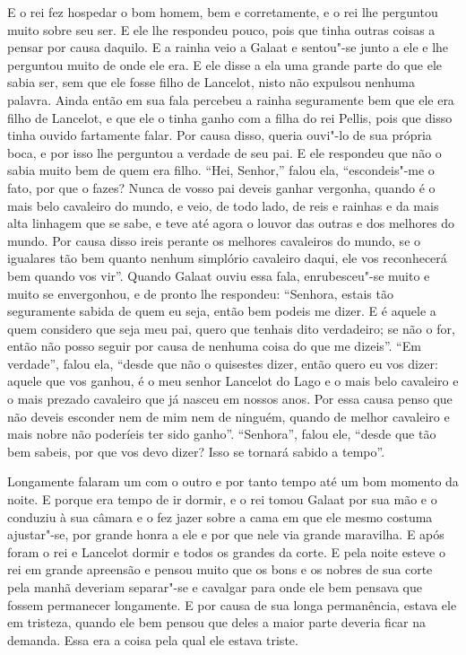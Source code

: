 E o rei fez hospedar o bom homem, bem e corretamente, e o rei lhe perguntou
muito sobre seu ser. E ele lhe respondeu pouco, pois que tinha outras coisas a
pensar por causa daquilo. E a rainha veio a Galaat e sentou"-se junto a ele e
lhe perguntou muito de onde ele era. E ele disse a ela uma grande parte do que
ele sabia ser, sem que ele fosse filho de Lancelot, nisto não expulsou nenhuma
palavra. Ainda então em sua fala percebeu a rainha seguramente bem que ele era
filho de Lancelot, e que ele o tinha ganho com a filha do rei Pellis,  pois
que disso tinha ouvido fartamente falar. Por causa disso, queria ouvi"-lo de sua
própria boca, e por isso lhe perguntou a verdade de seu pai. E ele respondeu
que não o sabia muito bem de quem era filho. “Hei, Senhor,” falou ela,
“escondeis"-me o fato, por que o fazes? Nunca de vosso pai deveis ganhar
vergonha, quando é o mais belo cavaleiro do mundo, e veio, de todo lado, de
reis e rainhas e da mais alta linhagem que se sabe, e teve até agora o louvor
das outras e dos melhores do mundo. Por causa disso ireis perante os melhores
cavaleiros do mundo, se o igualares tão bem quanto nenhum simplório cavaleiro
daqui, ele vos reconhecerá bem quando vos vir”. Quando Galaat ouviu
essa fala, enrubesceu"-se muito e muito se envergonhou, e de pronto lhe
respondeu: “Senhora, estais tão seguramente sabida de quem eu seja, então bem
podeis me dizer. E é aquele a quem considero que seja meu pai, quero que
tenhais dito verdadeiro; se não o for, então não posso seguir por causa de
nenhuma coisa do que me dizeis”. “Em verdade”, falou ela, “desde que não o
quisestes dizer, então quero eu vos dizer: aquele que vos ganhou, é o meu
senhor Lancelot do Lago e o mais belo cavaleiro e o mais prezado cavaleiro que
já nasceu em nossos anos. Por essa causa penso que não deveis esconder nem de
mim nem de ninguém, quando de melhor cavaleiro e mais nobre não poderíeis ter
sido ganho”. “Senhora”, falou ele, “desde que tão bem sabeis, por que vos devo
dizer? Isso se tornará sabido a tempo”.

Longamente falaram um com o outro e por tanto tempo até um bom momento da noite.
E porque era tempo de ir dormir, e o rei tomou Galaat por sua mão e o conduziu
à sua câmara e o fez jazer sobre a cama em que ele mesmo costuma ajustar"-se,
por grande honra a ele e por que nele via grande maravilha. E após foram o rei
e Lancelot dormir e todos os grandes da corte. E pela noite esteve o rei em
grande apreensão e pensou muito que os bons e os nobres de sua corte pela manhã
deveriam separar"-se e cavalgar para onde ele bem pensava que fossem permanecer
longamente. E por causa de sua longa permanência, estava ele em tristeza,
quando ele bem pensou que deles a maior parte deveria ficar na demanda. Essa
era a coisa pela qual ele estava triste.


